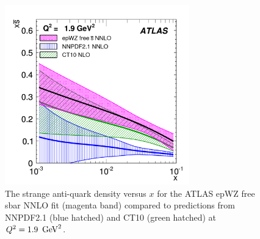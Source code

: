 \begin{description}
\begin{itemize}
\begin{figure}[!ht]
  \centering
  \includegraphics[width=8cm]{atlas.pdf}
  \caption{The strange anti-quark density versus $x$ for the ATLAS
    epWZ free sbar NNLO fit (magenta band) compared to predictions
    from NNPDF2.1 (blue hatched) and CT10 (green hatched) at $Q^2 = 1.9\ \,\text{Ge\hspace{-.08em}V}^2$.}
  \label{fig:atlas}
\end{figure}


\end{itemize}
\end{description}
